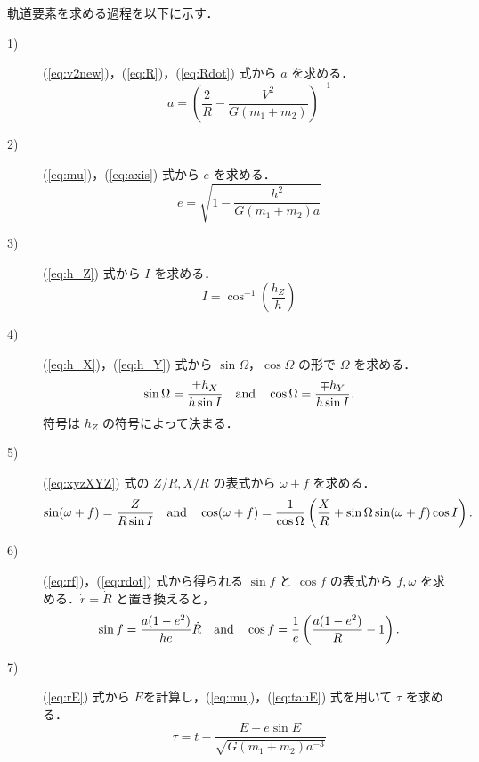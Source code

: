 \documentclass[11pt,a4paper,oneside,onecolumn]{jarticle}
\begin{document}
軌道要素を求める過程を以下に示す．

\begin{description}
\item[1)] (\ref{eq:v2new})，(\ref{eq:R})，(\ref{eq:Rdot}) 式から $a$ を求める．
\begin{equation}
a = \left( \frac{2}{R} -\frac{V^2}{G (m_1 + m_2)} \right)^{-1} \label{eq:axis}
\end{equation}
\item[2)] (\ref{eq:mu})，(\ref{eq:axis}) 式から $e$ を求める．
\begin{equation}
e = \sqrt{1- \frac{h^2}{G (m_1 + m_2) a}} \label{eq:ecc}
\end{equation}
\item[3)] (\ref{eq:h_Z}) 式から $I$ を求める．
\begin{equation}
I = \cos^{-1} \left( \frac{h_Z}{h} \right) \label{eq:inc}
\end{equation}
\item[4)] (\ref{eq:h_X})，(\ref{eq:h_Y}) 式から $\sin \Omega，\cos \Omega$ の形で $\Omega$ を求める．
\begin{equation}
\sin \Omega = \frac{\pm h_X}{h \sin I} \quad {\rm and} \quad \cos \Omega = \frac{\mp h_Y}{h \sin I}. \label{eq:OMEGA}
\end{equation}
符号は $h_Z$ の符号によって決まる．
\item[5)] (\ref{eq:xyzXYZ}) 式の $Z/R, X/R$ の表式から $\omega + f$ を求める．
\begin{equation}
\sin (\omega + f) = \frac{Z}{R \sin I} \quad {\rm and} \quad \cos (\omega + f) = \frac{1}{\cos \Omega} \left( \frac{X}{R} + \sin \Omega \sin (\omega + f) \cos I \right). \label{eq:omega+f}
\end{equation}
\item[6)] (\ref{eq:rf})，(\ref{eq:rdot}) 式から得られる $\sin f$ と $\cos f$ の表式から $f, \omega$ を求める．$\dot{r} = \dot{R}$ と置き換えると，
\begin{equation}
\sin f = \frac{a (1 - e^2)}{h e} \dot{R} \quad {\rm and} \quad \cos f = \frac{1}{e} \left( \frac{a (1 - e^2)}{R} - 1 \right). \label{eq:f}
\end{equation}
\item[7)] (\ref{eq:rE}) 式から $E$を計算し，(\ref{eq:mu})，(\ref{eq:tauE}) 式を用いて $\tau$ を求める．
\begin{equation}
\tau = t - \frac{E - e \sin E}{\sqrt{G (m_1 + m_2) a^{-3}}} \label{eq:tau}
\end{equation}
\end{description}
\end{document}
